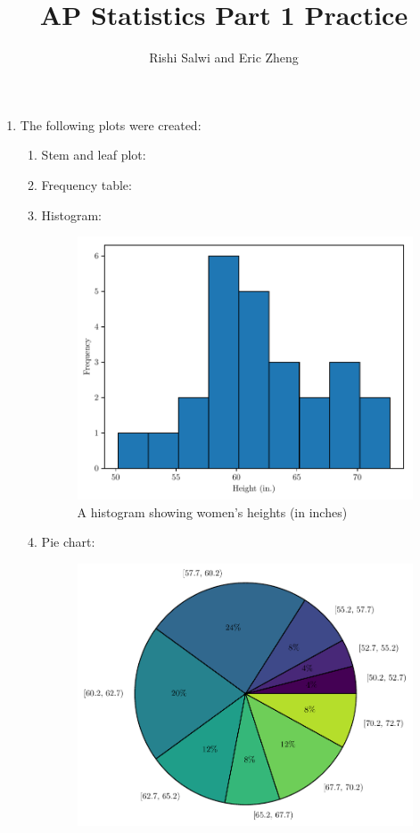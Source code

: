 \documentclass{article}
\title{AP Statistics Part 1 Practice}
\author{Rishi Salwi and Eric Zheng}
\begin{document}
\maketitle

\begin{enumerate}
  \item The following plots were created:
    \begin{enumerate}
      \item Stem and leaf plot:
      \item Frequency table:
      \item Histogram:
        \begin{figure}[H]
          \centering
          \includegraphics[width=\textwidth]{histogram.pdf}
          \caption{A histogram showing women's heights (in inches)}
        \end{figure}
      \item Pie chart:
        \begin{figure}[H]
          \centering
          \includegraphics[width=\textwidth]{pie.pdf}

\end{figure}
\end{enumerate}
\end{enumerate}
\end{document}
